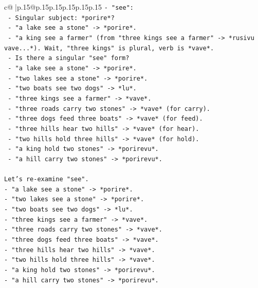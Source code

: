 \documentclass{article}
\begin{document}
{\begin{supertabular}{c@{$\;$}|p{.15\linewidth}@{}p{.15\linewidth}p{.15\linewidth}p{.15\linewidth}p{.15\linewidth}p{.15\linewidth}}
{{{\texttt{{-} "see":} \\
\texttt{  {-} Singular subject: *porire*?} \\
\texttt{    {-} "a lake see a stone" {-}> *porire*.} \\
\texttt{    {-} "a king see a farmer" (from "three kings see a farmer" {-}> *rusivu vave...*). Wait, "three kings" is plural, verb is *vave*.} \\
\texttt{    {-} Is there a singular "see" form?} \\
\texttt{    {-} "a lake see a stone" {-}> *porire*.} \\
\texttt{    {-} "two lakes see a stone" {-}> *porire*.} \\
\texttt{    {-} "two boats see two dogs" {-}> *lu*.} \\
\texttt{    {-} "three kings see a farmer" {-}> *vave*.} \\
\texttt{    {-} "three roads carry two stones" {-}> *vave* (for carry).} \\
\texttt{    {-} "three dogs feed three boats" {-}> *vave* (for feed).} \\
\texttt{    {-} "three hills hear two hills" {-}> *vave* (for hear).} \\
\texttt{    {-} "two hills hold three hills" {-}> *vave* (for hold).} \\
\texttt{    {-} "a king hold two stones" {-}> *porirevu*.} \\
\texttt{    {-} "a hill carry two stones" {-}> *porirevu*.} \\
\\ 
\texttt{Let's re{-}examine "see".} \\
\texttt{{-} "a lake see a stone" {-}> *porire*.} \\
\texttt{{-} "two lakes see a stone" {-}> *porire*.} \\
\texttt{{-} "two boats see two dogs" {-}> *lu*.} \\
\texttt{{-} "three kings see a farmer" {-}> *vave*.} \\
\texttt{{-} "three roads carry two stones" {-}> *vave*.} \\
\texttt{{-} "three dogs feed three boats" {-}> *vave*.} \\
\texttt{{-} "three hills hear two hills" {-}> *vave*.} \\
\texttt{{-} "two hills hold three hills" {-}> *vave*.} \\
\texttt{{-} "a king hold two stones" {-}> *porirevu*.} \\
\texttt{{-} "a hill carry two stones" {-}> *porirevu*.} \\
}}}
\end{supertabular}}
\end{document}

